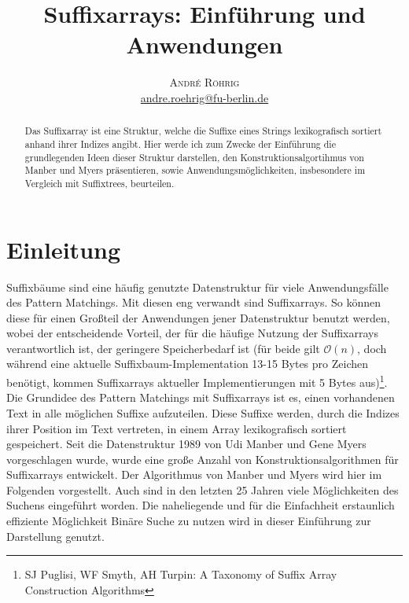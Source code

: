\documentclass[twoside]{article}
\title{\vspace{-15mm}\fontsize{24pt}{10pt}\selectfont\textbf{Suffixarrays:
    Einführung und Anwendungen
}} %
\author{
\large
\textsc{André Röhrig} \\ %
\normalsize \href{mailto:andre.roehrig@fu-berlin.de}{andre.roehrig@fu-berlin.de} %
\vspace{-5mm}
}
\date{}
\begin{document}
\maketitle %

\thispagestyle{fancy} %

\begin{abstract}Das Suffixarray ist eine Struktur, welche
  die Suffixe eines Strings lexikografisch sortiert anhand
  ihrer Indizes angibt. Hier werde ich zum Zwecke der
  Einführung die grundlegenden Ideen dieser Struktur
  darstellen, den Konstruktionsalgortihmus von Manber und
  Myers präsentieren, sowie
  Anwendungsmöglichkeiten, insbesondere im Vergleich mit
  Suffixtrees, beurteilen.

\noindent

\end{abstract}

\section{Einleitung}
Suffixbäume sind eine häufig genutzte Datenstruktur für
viele Anwendungsfälle des Pattern Matchings. Mit diesen eng
verwandt sind Suffixarrays. So können diese für einen
Großteil der Anwendungen jener Datenstruktur benutzt werden,
wobei der entscheidende Vorteil, der für die häufige Nutzung
der Suffixarrays verantwortlich ist, der geringere
Speicherbedarf ist (für beide gilt $\mathcal{O}(n)$, doch während
eine aktuelle Suffixbaum-Implementation 13-15 Bytes pro
Zeichen benötigt, kommen Suffixarrays aktueller
Implementierungen mit 5 Bytes aus)\footnote{SJ Puglisi, WF Smyth, AH Turpin: A Taxonomy of Suffix Array Construction
Algorithms}. \\
Die Grundidee des Pattern Matchings mit Suffixarrays ist es, einen vorhandenen
Text in alle möglichen Suffixe aufzuteilen. Diese Suffixe
werden, durch die Indizes ihrer Position im Text vertreten, in einem Array
lexikografisch sortiert gespeichert. Seit die Datenstruktur
1989 von Udi Manber und Gene Myers vorgeschlagen wurde, wurde eine große
Anzahl von Konstruktionsalgorithmen für Suffixarrays
entwickelt. Der Algorithmus von Manber und Myers wird hier
im Folgenden vorgestellt.
Auch sind in den letzten 25 Jahren viele Möglichkeiten des
Suchens eingeführt worden. Die naheliegende und für die
Einfachheit erstaunlich effiziente Möglichkeit
Binäre Suche zu nutzen wird in dieser Einführung zur
Darstellung genutzt.
\end{document}
